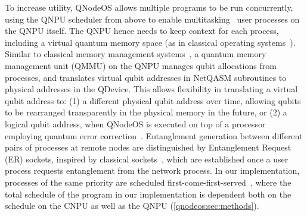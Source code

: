 To increase utility, QNodeOS allows multiple programs to be run concurrently, using the QNPU scheduler from above to enable multitasking~\cite{mccullough_design_1965-1,dennis_segmentation_1965} user processes on the QNPU itself. The QNPU hence needs to keep context for each process, including a virtual quantum memory space (as in classical operating systems~\cite{daley_virtual_1968-1}). Similar to classical memory management systems~\cite{peterson_operating_1985}, a quantum memory management unit (QMMU) on the QNPU manages qubit allocations from processes, and translates virtual qubit addresses in NetQASM subroutines to physical addresses in the QDevice. This allows flexibility in translating a virtual qubit address to: (1) a different physical qubit address over time, allowing qubits to be rearranged transparently in the physical memory in the future, or (2) a logical qubit address, when QNodeOS is executed on top of a processor employing quantum error correction~\cite{lidar2013quantum}. Entanglement generation between different pairs of processes at remote nodes are distinguished by Entanglement Request (ER) sockets, inspired by classical sockets~\cite{chesson_network_1975-1,leach_architecture_1983}, which are established once a user process requests entanglement from the network process. In our implementation, processes of the same priority are scheduled first-come-first-served~\cite{peterson_operating_1985}, where the total schedule of the program in our implementation is dependent both on the schedule on the CNPU as well as the QNPU (\cref{qnodeos:sec:methods}).


